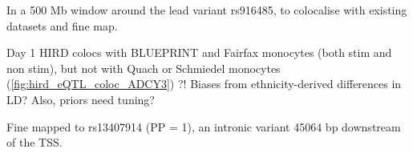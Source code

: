 %
\begin{outline}

\1 In a 500 Mb window around the lead  variant rs916485,  to colocalise with existing datasets and fine map.

\1 Day 1 HIRD colocs with BLUEPRINT and Fairfax monocytes (both stim and non stim), but not with Quach or Schmiedel monocytes (\autoref{fig:hird_eQTL_coloc_ADCY3}) ?!
\2 Biases from ethnicity-derived differences in LD?
\2 Also, priors need tuning?

\1 Fine mapped to rs13407914 (PP = 1), an intronic variant 45064 bp downstream of the TSS.


\end{outline}

